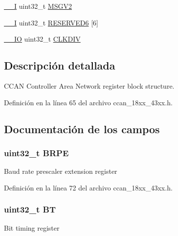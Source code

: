 \begin{DoxyCompactItemize}
\item 
\hyperlink{core__sc300_8h_af63697ed9952cc71e1225efe205f6cd3}{\+\_\+\+\_\+I} uint32\+\_\+t \hyperlink{struct_l_p_c___c_c_a_n___t_ab4528d1ef41869057b53d3c68074802a}{M\+S\+G\+V2}
\item 
\hyperlink{core__sc300_8h_af63697ed9952cc71e1225efe205f6cd3}{\+\_\+\+\_\+I} uint32\+\_\+t \hyperlink{struct_l_p_c___c_c_a_n___t_a656b237e614b6d241574604849d86b8b}{R\+E\+S\+E\+R\+V\+E\+D6} \mbox{[}6\mbox{]}
\item 
\hyperlink{core__sc300_8h_aec43007d9998a0a0e01faede4133d6be}{\+\_\+\+\_\+\+IO} uint32\+\_\+t \hyperlink{struct_l_p_c___c_c_a_n___t_a2a33dba1349d1ebe45133cb2789a5307}{C\+L\+K\+D\+IV}
\end{DoxyCompactItemize}


\subsection{Descripción detallada}
C\+C\+AN Controller Area Network register block structure. 

Definición en la línea 65 del archivo ccan\+\_\+18xx\+\_\+43xx.\+h.



\subsection{Documentación de los campos}
\subsubsection[{\texorpdfstring{B\+R\+PE}{BRPE}}]{ uint32\+\_\+t B\+R\+PE}\hypertarget{struct_l_p_c___c_c_a_n___t_a36b5bb69b2c273aa0fefe8e0c852d270}{}\label{struct_l_p_c___c_c_a_n___t_a36b5bb69b2c273aa0fefe8e0c852d270}
Baud rate prescaler extension register 

Definición en la línea 72 del archivo ccan\+\_\+18xx\+\_\+43xx.\+h.

\subsubsection[{\texorpdfstring{BT}{BT}}]{ uint32\+\_\+t BT}\hypertarget{struct_l_p_c___c_c_a_n___t_a1b9452a1b62004b6e1e81efd18704630}{}\label{struct_l_p_c___c_c_a_n___t_a1b9452a1b62004b6e1e81efd18704630}
Bit timing register 

